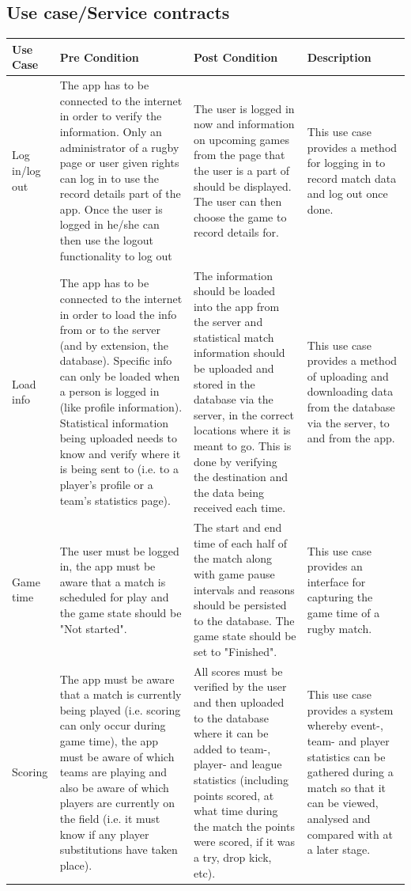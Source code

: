 \documentclass[a4paper,12pt]{report}
\begin{document}
\subsection{Use case/Service contracts}
\begin{center}
  \begin{longtable}{| p{3cm} | p{4cm} | p{4cm} | p{4cm} |}
    \hline
    Use Case & Pre Condition & Post Condition & Description \\ 
    \hline \hline
    Log in/log out & The app has to be connected to the internet in order to verify the information. Only an administrator of a rugby page or user given rights can log in to use the record details part of the app. Once the user is logged in he/she can then use the logout functionality to log out & The user is logged in now and information on upcoming games from the page that the user is a part of should be displayed. The user can then choose the game to record details for. & This use case provides a method for logging in to record match data and log out once done.\\ 
    \hline
    Load info & The app has to be connected to the internet in order to load the info from or to the server (and by extension, the database). Specific info can only be loaded when a person is logged in (like profile information). Statistical information being uploaded needs to know and verify where it is being sent to (i.e. to a player's profile or a team's statistics page). & The information should be loaded into the app from the server and statistical match information should be uploaded and stored in the database via the server, in the correct locations where it is meant to go. This is done by verifying the destination and the data being received each time. & This use case provides a method of uploading and downloading data from the database via the server, to and from the app. \\ 
    \hline
    Game time & The user must be logged in, the app must be aware that a match is scheduled for play and the game state should be "Not started". & The start and end time of each half of the match along with game pause intervals and reasons should be persisted to the database. The game state should be set to "Finished".  & This use case provides an interface for capturing the game time of a rugby match. \\ 
    \hline
    Scoring & The app must be aware that a match is currently being played (i.e. scoring can only occur during game time), the app must be aware of which teams are playing and also be aware of which players are currently on the field (i.e. it must know if any player substitutions have taken place). & All scores must be verified by the user and then uploaded to the database where it can be added to team-, player- and league statistics (including points scored, at what time during the match the points were scored, if it was a try, drop kick, etc). & This use case provides a system whereby event-, team- and player statistics can be gathered during a match so that it can be viewed, analysed and compared with at a later stage.\\ \hline

\end{longtable}
\end{center}
\end{document}
